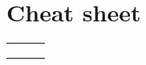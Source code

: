 \documentclass{article}
\begin{document}
\section*{Cheat sheet}

\begin{tabular}{| L | L | L |}
\hline
 & 
 &
 \\
\hline
 &
 & 
 \\
\hline
 & 
 &
 \\
\hline
 &
 & 
 \\
\hline
\end{tabular}
\end{document}
